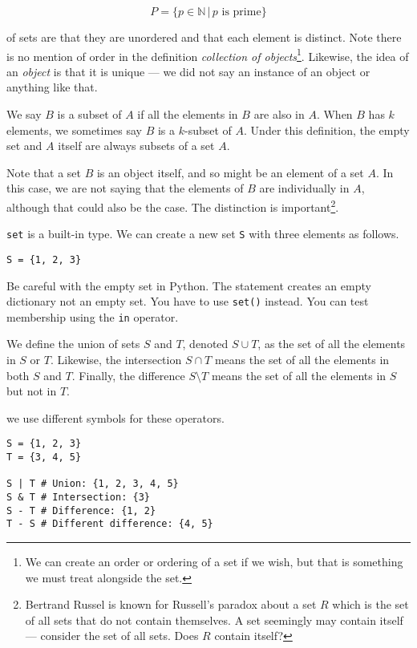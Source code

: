 \documentclass{iansnotes}
\begin{document}
  $$ P = \{ p \in \mathbb{N} \, | \, p \textrm{ is prime} \} $$

   of sets are that they are unordered and that each element is distinct.
  Note there is no mention of order in the definition \emph{collection of objects}\footnote{We can create an order or ordering of a set if we wish, but that is something we must treat alongside the set.}.
  Likewise, the idea of an \emph{object} is that it is unique --- we did not say an instance of an object or anything like that.

  We say $B$ is a subset of $A$ if all the elements in $B$ are also in $A$.
  When $B$ has $k$ elements, we sometimes say $B$ is a $k$-subset of $A$.
  Under this definition, the empty set and $A$ itself are always subsets of a set $A$.

  Note that a set $B$ is an object itself, and so might be an element of a set $A$.
  In this case, we are not saying that the elements of $B$ are individually in $A$, although that could also be the case.
  The distinction is important\footnote{Bertrand Russel is known for Russell's paradox about a set $R$ which is the set of all sets that do not contain themselves. A set seemingly may contain itself --- consider the set of all sets. Does $R$ contain itself?}.

   \texttt{set} is a built-in type.
  We can create a new set \texttt{S} with three elements as follows.
  \begin{verbatim}
S = {1, 2, 3}
  \end{verbatim}
  Be careful with the empty set in Python.
  The statement \texttt{{}} creates an empty dictionary not an empty set.
  You have to use \texttt{set()} instead.
  You can test membership using the \texttt{in} operator.

  We define the union of sets $S$ and $T$, denoted $S \cup T$, as the set of all the elements in $S$ or $T$.
  Likewise, the intersection $S \cap T$ means the set of all the elements in both $S$ and $T$.
  Finally, the difference $S \setminus T$ means the set of all the elements in $S$ but not in $T$.

   we use different symbols for these operators.
  \begin{verbatim}
S = {1, 2, 3}
T = {3, 4, 5}

S | T # Union: {1, 2, 3, 4, 5}
S & T # Intersection: {3}
S - T # Difference: {1, 2}
T - S # Different difference: {4, 5}
  \end{verbatim}
\end{document}
